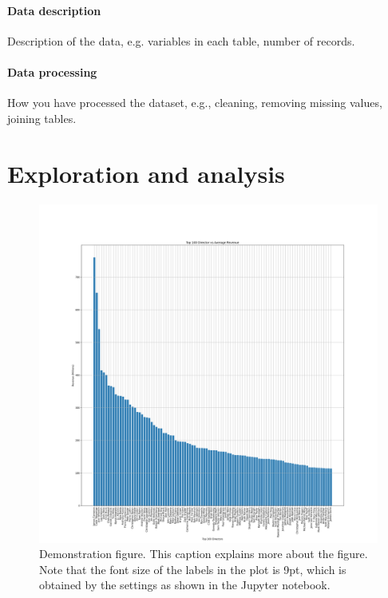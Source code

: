 \documentclass[11pt,a4paper]{article}
\begin{document}
        \paragraph{Data description}
            Description of the data, e.g. variables in each table, number of records.

        \paragraph{Data processing}
            How you have processed the dataset, e.g., cleaning, removing missing values,
                joining tables.

    \section{Exploration and  analysis}

        \begin{figure}[t]
            \centering
            \includegraphics{Directors vs Average Revenue.png}
            \caption{Demonstration figure.
                This caption explains more about the figure.
                Note that the font size of the labels in the plot is 9pt, which is obtained by
                    the settings as shown in the Jupyter notebook.
            }
            \label{fds-project-template:fig:example1}
        \end{figure}
\end{document}
